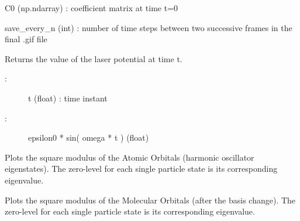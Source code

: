 \documentclass[letterpaper,10pt,english]{sphinxmanual}
\begin{document}
\begin{fulllineitems}
\begin{fulllineitems}
\begin{description}
C0 (np.ndarray) : coefficient matrix at time t=0

save\_every\_n (int) : number of time steps between two successive frames in the final .gif file

\end{description}

\end{fulllineitems}


\begin{fulllineitems}
\label{\detokenize{index:do.GHF.laser_potential}}
Returns the value of the laser potential at time t.
\begin{description}
\item[{:}] \leavevmode
t (float) : time instant

\item[{:}] \leavevmode
epsilon0 * sin( omega * t ) (float)

\end{description}

\end{fulllineitems}


\begin{fulllineitems}
\label{\detokenize{index:do.GHF.plot_AO}}
Plots the square modulus of the Atomic Orbitals (harmonic oscillator eigenstates).
The zero-level for each single particle state is its corresponding eigenvalue.

\end{fulllineitems}


\begin{fulllineitems}
\label{\detokenize{index:do.GHF.plot_MO}}
Plots the square modulus of the Molecular Orbitals (after the basis change).
The zero-level for each single particle state is its corresponding eigenvalue.

\end{fulllineitems}


\end{fulllineitems}
\end{document}
